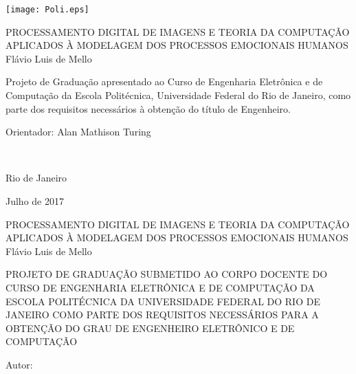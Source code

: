 \texttt{[image: Poli.eps]}

\begin{center}
\large{PROCESSAMENTO DIGITAL DE IMAGENS E TEORIA DA COMPUTAÇÃO APLICADOS À MODELAGEM DOS PROCESSOS EMOCIONAIS HUMANOS}\\
   \vspace{2cm}
\large{Flávio Luis de Mello}\\
\end{center}
   \vspace{3cm}
\hspace{7cm}
\hfill \parbox{8.0cm}{Projeto de Graduação apresentado ao Curso de Engenharia Eletrônica e de Computação da Escola Politécnica, Universidade Federal do Rio de Janeiro, como parte dos requisitos necessários à obtenção do título de Engenheiro.\\}
   \vspace{2cm}
\hfill \parbox{8.0cm}{Orientador: Alan Mathison Turing} \\
   \vspace{2cm}
\begin{center}
Rio de Janeiro

Julho de 2017
\end{center}




\pagebreak


\begin{center}
\large{PROCESSAMENTO DIGITAL DE IMAGENS E TEORIA DA COMPUTAÇÃO APLICADOS À MODELAGEM DOS PROCESSOS EMOCIONAIS HUMANOS}\\
   \vspace{1cm}
\large{Flávio Luis de Mello}\\
\end{center}
   \vspace{2cm}
PROJETO DE GRADUAÇÃO SUBMETIDO AO CORPO DOCENTE DO CURSO DE ENGENHARIA ELETRÔNICA E DE COMPUTAÇÃO DA ESCOLA POLITÉCNICA DA UNIVERSIDADE FEDERAL DO RIO DE JANEIRO COMO PARTE DOS REQUISITOS NECESSÁRIOS PARA A OBTENÇÃO DO GRAU DE ENGENHEIRO ELETRÔNICO E DE COMPUTAÇÃO   
   
   \vspace{1cm}
Autor:
      \vspace{0.5cm}
      \begin{flushright}
         \parbox{10cm}{
            \hrulefill

            \vspace{-.375cm}

            \vspace{0.1cm}
         }
      \end{flushright}
      
